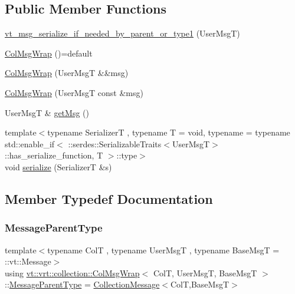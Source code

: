 \subsection*{Public Member Functions}
\begin{DoxyCompactItemize}
\item 
\hyperlink{structvt_1_1vrt_1_1collection_1_1_col_msg_wrap_a016c2ea5370660027aa23dc0dcf44a74}{vt\+\_\+msg\+\_\+serialize\+\_\+if\+\_\+needed\+\_\+by\+\_\+parent\+\_\+or\+\_\+type1} (User\+MsgT)
\item 
\hyperlink{structvt_1_1vrt_1_1collection_1_1_col_msg_wrap_a341d1ea25fb9181d1c06ab66df1478f9}{Col\+Msg\+Wrap} ()=default
\item 
\hyperlink{structvt_1_1vrt_1_1collection_1_1_col_msg_wrap_a9dfc351adf1f31fda9028608d989ce5c}{Col\+Msg\+Wrap} (User\+MsgT \&\&msg)
\item 
\hyperlink{structvt_1_1vrt_1_1collection_1_1_col_msg_wrap_ac19f3573a80a849d41fd5874fe94414a}{Col\+Msg\+Wrap} (User\+MsgT const \&msg)
\item 
User\+MsgT \& \hyperlink{structvt_1_1vrt_1_1collection_1_1_col_msg_wrap_a69d30485a72651a7ede17f6bcdb13cd4}{get\+Msg} ()
\item 
{\footnotesize template$<$typename SerializerT , typename T  = void, typename  = typename std\+::enable\+\_\+if$<$      \+::serdes\+::\+Serializable\+Traits$<$\+User\+Msg\+T$>$\+::has\+\_\+serialize\+\_\+function, T    $>$\+::type$>$ }\\void \hyperlink{structvt_1_1vrt_1_1collection_1_1_col_msg_wrap_ad225439a1358090be0ad57cb536eb1d3}{serialize} (SerializerT \&s)
\end{DoxyCompactItemize}


\subsection{Member Typedef Documentation}
\mbox{\label{structvt_1_1vrt_1_1collection_1_1_col_msg_wrap_a51803f5a5355ade7dc2d1a46753ab4e9}} 
\subsubsection{\texorpdfstring{Message\+Parent\+Type}{MessageParentType}}
{\footnotesize\ttfamily template$<$typename ColT , typename User\+MsgT , typename Base\+MsgT  = \+::vt\+::\+Message$>$ \\
using \hyperlink{structvt_1_1vrt_1_1collection_1_1_col_msg_wrap}{vt\+::vrt\+::collection\+::\+Col\+Msg\+Wrap}$<$ ColT, User\+MsgT, Base\+MsgT $>$\+::\hyperlink{structvt_1_1location_1_1_entity_msg_a186637100a628eb04cb00127f5579210}{Message\+Parent\+Type} =  \hyperlink{structvt_1_1vrt_1_1collection_1_1_collection_message}{Collection\+Message}$<$ColT,Base\+MsgT$>$}

